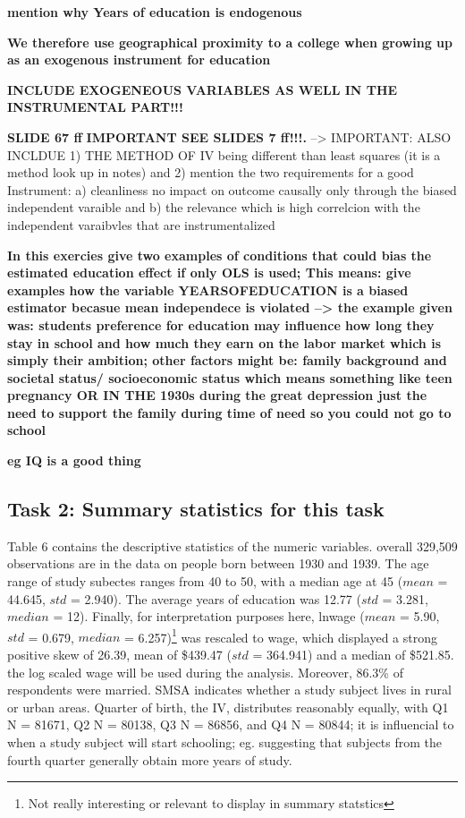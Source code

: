 \documentclass[a4paper]{article}
\begin{document}
\textbf{mention why Years of education is endogenous}

\textbf{ We therefore use geographical proximity to a college when growing up as an exogenous instrument for education}

\textbf{INCLUDE EXOGENEOUS VARIABLES AS WELL IN THE  INSTRUMENTAL PART!!!}

\textbf{SLIDE 67 ff}
\textbf{IMPORTANT SEE SLIDES 7 ff!!!.}
--> IMPORTANT: ALSO INCLDUE 1) THE METHOD OF IV being different than least squares (it is a method look up in notes) and 2) mention the two requirements for a good Instrument: a) cleanliness no impact on outcome causally only through the biased independent varaible and b) the relevance which is high correlcion with the independent varaibvles that are instrumentalized

\textbf{In this exercies give two examples of conditions that could bias the estimated education effect if only OLS is used; This means: give examples how the variable YEARSOFEDUCATION is a biased estimator becasue mean independece is violated --> the example given was: students preference for education may influence how long they stay in school and how much they earn on the labor market which is simply their ambition; other factors might be: family background and societal status/ socioeconomic status which means something like teen pregnancy OR IN THE 1930s during the great depression just the need to support the family during time of need so you could not go to school}

\textbf{eg IQ is a good thing}


\subsection{Task 2: Summary statistics for this task}

Table 6 contains the descriptive statistics of the numeric variables. overall 329,509 observations are in the data on people born between 1930 and 1939. The age range of study subectes ranges from 40 to 50, with a median age at 45 ($mean$ = 44.645, $std$ = 2.940). The average years of education was 12.77 ($std$ = 3.281, $median$ = 12). Finally, for interpretation purposes here, lnwage ($mean$ = 5.90, $std$ = 0.679, $median$ = 6.257)\footnote{Not really interesting or relevant to display in summary statstics}  was rescaled to wage, which displayed a strong positive skew of 26.39, mean of \$439.47 ($std$ = 364.941) and a median of \$521.85. the log scaled wage will be used during the analysis. 
Moreover, 86.3\% of respondents were married. SMSA indicates whether a study subject lives in rural or urban areas. Quarter of birth, the IV, distributes reasonably equally, with Q1 N = 81671, Q2 N = 80138, Q3 N = 86856, and Q4 N = 80844; it is influencial to when a study subject will start schooling; eg. suggesting that subjects from the fourth quarter generally obtain more years of study.  
\end{document}
